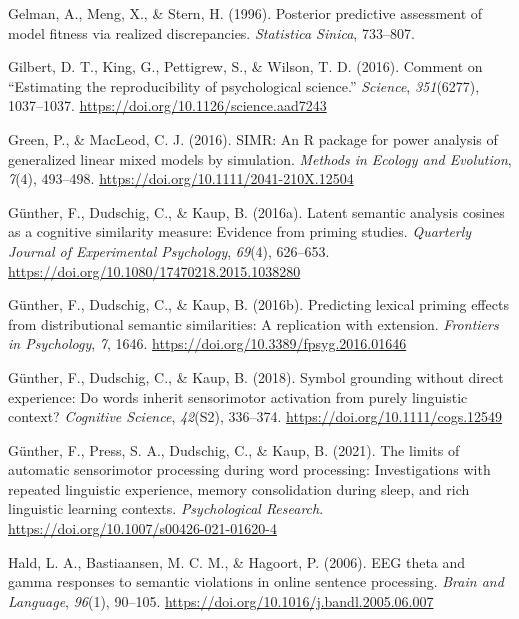\documentclass[
  12pt,
  man,floatsintext]{apa7}
\newlength{\cslhangindent}
\newlength{\cslentryspacingunit} %
\newenvironment{CSLReferences}[2] %
 {%
  \setlength{\parindent}{0pt}
  \ifodd #1
  \let\oldpar\par
  \def\par{\hangindent=\cslhangindent\oldpar}
  \fi
  \setlength{\parskip}{#2\cslentryspacingunit}
 }%
 {}
\begin{document}
\begin{CSLReferences}{1}{0}
\leavevmode{}%
Gelman, A., Meng, X., \& Stern, H. (1996). Posterior predictive assessment of model fitness via realized discrepancies. \emph{Statistica Sinica}, 733--807.

\leavevmode{}%
Gilbert, D. T., King, G., Pettigrew, S., \& Wilson, T. D. (2016). Comment on {``{Estimating} the reproducibility of psychological science.''} \emph{Science}, \emph{351}(6277), 1037--1037. \url{https://doi.org/10.1126/science.aad7243}

\leavevmode{}%
Green, P., \& MacLeod, C. J. (2016). {SIMR}: {An R} package for power analysis of generalized linear mixed models by simulation. \emph{Methods in Ecology and Evolution}, \emph{7}(4), 493--498. \url{https://doi.org/10.1111/2041-210X.12504}

\leavevmode{}%
Günther, F., Dudschig, C., \& Kaup, B. (2016a). Latent semantic analysis cosines as a cognitive similarity measure: {Evidence} from priming studies. \emph{Quarterly Journal of Experimental Psychology}, \emph{69}(4), 626--653. \url{https://doi.org/10.1080/17470218.2015.1038280}

\leavevmode{}%
Günther, F., Dudschig, C., \& Kaup, B. (2016b). Predicting lexical priming effects from distributional semantic similarities: {A} replication with extension. \emph{Frontiers in Psychology}, \emph{7}, 1646. \url{https://doi.org/10.3389/fpsyg.2016.01646}

\leavevmode{}%
Günther, F., Dudschig, C., \& Kaup, B. (2018). Symbol grounding without direct experience: Do words inherit sensorimotor activation from purely linguistic context? \emph{Cognitive Science}, \emph{42}(S2), 336--374. \url{https://doi.org/10.1111/cogs.12549}

\leavevmode{}%
Günther, F., Press, S. A., Dudschig, C., \& Kaup, B. (2021). The limits of automatic sensorimotor processing during word processing: Investigations with repeated linguistic experience, memory consolidation during sleep, and rich linguistic learning contexts. \emph{Psychological Research}. \url{https://doi.org/10.1007/s00426-021-01620-4}

\leavevmode{}%
Hald, L. A., Bastiaansen, M. C. M., \& Hagoort, P. (2006). {EEG} theta and gamma responses to semantic violations in online sentence processing. \emph{Brain and Language}, \emph{96}(1), 90--105. \url{https://doi.org/10.1016/j.bandl.2005.06.007}


\end{CSLReferences}
\end{document}

